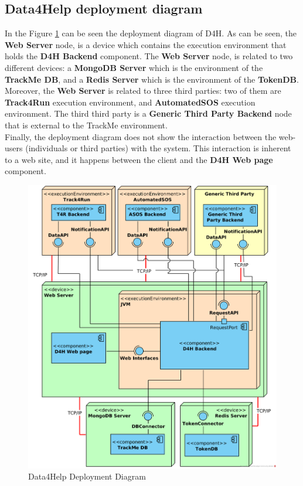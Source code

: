\documentclass[a4paper, hidelinks, 12pt]{report}
\begin{document}
	\subsection{Data4Help deployment diagram}
	In the Figure \ref{fig:d4h_deployment_diagram} can be seen the deployment diagram of D4H. As can be seen, the \textbf{Web Server} node, is a device which contains the execution environment that holds the \textbf{D4H Backend} component. The \textbf{Web Server} node, is related to two different devices: a \textbf{MongoDB Server} which is the environment of the \textbf{TrackMe DB}, and a \textbf{Redis Server} which is the environment of the \textbf{TokenDB}.\\
	
	Moreover, the \textbf{Web Server} is related to three third parties: two of them are \textbf{Track4Run} execution environment, and \textbf{AutomatedSOS} execution environment. The third third party is a \textbf{Generic Third Party Backend} node that is external to the TrackMe environment.\\
	
	Finally, the deployment diagram does not show the interaction between the web-users (individuals or third parties) with the system. This interaction is inherent to a web site, and it happens between the client and the \textbf{D4H Web page} component.
	
		\begin{figure}[H]
			\centering
			\includegraphics[width=1\textwidth]{diagrams/d4h_deployment_diagram.png}
			\caption[Data4Help Deployment Diagram]{Data4Help Deployment Diagram}
			\label{fig:d4h_deployment_diagram}
		\end{figure}	
		
\end{document}
